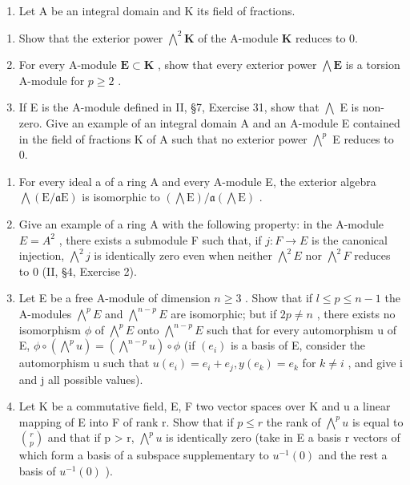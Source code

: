 \BourbakiExercisesSection

\begin{enumerate}
\def\labelenumi{\arabic{enumi}.}
\tightlist
\item
  Let A be an integral domain and K its field of fractions.
\end{enumerate}

\begin{enumerate}
\def\labelenumi{(\alph{enumi})}
\item
  Show that the exterior power \(\bigwedge^{2}\mathbf{K}\) of the A-module \(\mathbf{K}\) reduces to 0.
\item
  For every A-module \(\mathbf{E} \subset \mathbf{K}\) , show that every exterior power \(\bigwedge \mathbf{E}\) is a torsion A-module for \(p \geqslant 2\) .
\item
  If E is the A-module defined in II, §7, Exercise 31, show that \(\bigwedge\) E is non-zero. Give an example of an integral domain A and an A-module E contained in the field of fractions K of A such that no exterior power \(\bigwedge^{p}\) E reduces to 0.
\end{enumerate}

\begin{enumerate}
\def\labelenumi{\arabic{enumi}.}
\setcounter{enumi}{1}
\item
  For every ideal a of a ring A and every A-module E, the exterior algebra \(\bigwedge(\mathrm{E}/\mathfrak{a}\mathrm{E})\) is isomorphic to \((\bigwedge\mathrm{E})/\mathfrak{a}(\bigwedge\mathrm{E})\) .
\item
  Give an example of a ring A with the following property: in the A-module \(E = A^{2}\) , there exists a submodule F such that, if \(j: F \to E\) is the canonical injection, \(\bigwedge^{2} j\) is identically zero even when neither \(\bigwedge^{2} E\) nor \(\bigwedge^{2} F\) reduces to 0 (II, §4, Exercise 2).
\item
  Let E be a free A-module of dimension \(n \geqslant 3\) . Show that if \(l \leqslant p \leqslant n - 1\) the A-modules \(\bigwedge^{p}E\) and \(\bigwedge^{n-p}E\) are isomorphic; but if \(2p \neq n\) , there exists no isomorphism \(\phi\) of \(\bigwedge^{p}E\) onto \(\bigwedge^{n-p}E\) such that for every automorphism u of E, \(\phi \circ \left(\bigwedge^{p}u\right) = \left(\bigwedge^{n-p}u\right) \circ \phi\) (if \((e_{i})\) is a basis of E, consider the automorphism u such that \(u(e_{i}) = e_{i} + e_{j}, y(e_{k}) = e_{k}\) for \(k \neq i\) , and give i and j all possible values).
\item
  Let K be a commutative field, E, F two vector spaces over K and u a linear mapping of E into F of rank r. Show that if \(p \leqslant r\) the rank of \(\bigwedge^{p}u\) is equal to \(\binom{r}{p}\) and that if p \textgreater{} r, \(\bigwedge^{p}u\) is identically zero (take in E a basis r vectors of which form a basis of a subspace supplementary to \(u^{-1}(0)\) and the rest a basis of \(u^{-1}(0)\) ).
\end{enumerate}

